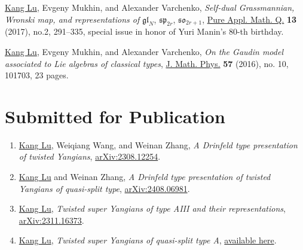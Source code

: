 \documentclass[11pt,letterpaper,roman,colorlinks,urlcolor=blue,linkcolor=blue
]{moderncv}
\begin{document}
\begin{etaremune}[leftmargin=1.17cm]
\item \underline{Kang Lu}, Evgeny Mukhin, and Alexander Varchenko, {\textit{Self-dual Grassmannian, Wronski map, and representations of} $\mathfrak{gl}_N$, $\mathfrak{sp}_{2r}$, $\mathfrak{so}_{2r+1}$}, \href{http://dx.doi.org/10.4310/PAMQ.2017.v13.n2.a4}{Pure Appl. Math. Q.} {\textbf{13}} (2017), no.2, 291--335, special issue in honor of Yuri Manin's 80-th birthday.
                    
\item \underline{Kang Lu}, Evgeny Mukhin, and Alexander Varchenko, {\textit{On the Gaudin model associated to Lie algebras of classical types}}, \href{https://doi.org/10.1063/1.4964389}{J. Math. Phys.} {\textbf{57}} (2016), no. 10, 101703, 23 pages.
\end{etaremune}
        
\section{Submitted for Publication}

\begin{enumerate}[leftmargin=1.37cm]


\item \underline{Kang Lu}, Weiqiang Wang, and Weinan Zhang, {\textit{A Drinfeld type presentation of twisted Yangians}}, \href{https://arxiv.org/abs/2308.12254}{arXiv:2308.12254}. 



\item \underline{Kang Lu} and Weinan Zhang, {\textit{A Drinfeld type presentation of twisted Yangians of quasi-split type}}, \href{https://arxiv.org/abs/2408.06981}{arXiv:2408.06981}.

\item \underline{Kang Lu}, {\textit{Twisted super Yangians of type AIII and their representations}}, \href{https://arxiv.org/abs/2311.16373}{arXiv:2311.16373}.


\item \underline{Kang Lu}, {\textit{Twisted super Yangians of quasi-split type A}}, \href{https://kanglu.me/writings/Twisted_super_Yangians_of_quasi-split_type_A.pdf}{available here}.




\end{enumerate}
\end{document}
